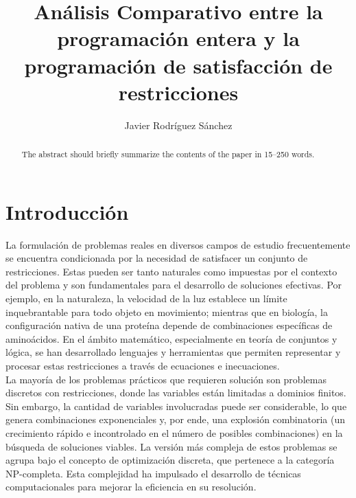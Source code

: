 \documentclass[12pt]{report}
\begin{document}
%
\title{Análisis Comparativo entre la programación entera y la programación de satisfacción de restricciones}

%
\author{Javier Rodríguez Sánchez}

\maketitle 

\begin{abstract}
The abstract should briefly summarize the contents of the paper in
15--250 words.

\end{abstract}
%

\newpage

\tableofcontents

\newpage
\chapter{Introducción}

La formulación de problemas reales en diversos campos de estudio frecuentemente se encuentra condicionada por la necesidad de satisfacer un conjunto de restricciones. Estas pueden ser tanto naturales como impuestas por el contexto del problema y son fundamentales para el desarrollo de soluciones efectivas. Por ejemplo, en la naturaleza, la velocidad de la luz establece un límite inquebrantable para todo objeto en movimiento; mientras que en biología, la configuración nativa de una proteína depende de combinaciones específicas de aminoácidos. En el ámbito matemático, especialmente en teoría de conjuntos y lógica, se han desarrollado lenguajes y herramientas que permiten representar y procesar estas restricciones a través de ecuaciones e inecuaciones. \\

La mayoría de los problemas prácticos que requieren solución son problemas discretos con restricciones, donde las variables están limitadas a dominios finitos. Sin embargo, la cantidad de variables involucradas puede ser considerable, lo que genera combinaciones exponenciales y, por ende, una explosión combinatoria (un crecimiento rápido e incontrolado en el número de posibles combinaciones) en la búsqueda de soluciones viables. La versión más compleja de estos problemas se agrupa bajo el concepto de optimización discreta, que pertenece a la categoría NP-completa. Esta complejidad ha impulsado el desarrollo de técnicas computacionales para mejorar la eficiencia en su resolución.  \\
\end{document}
